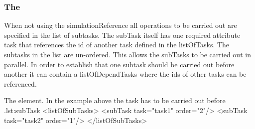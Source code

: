 \subsubsection{ The }
\label{class:subTasks}
When not using the simulationReference all operations to be carried out are specified in the list of subtasks. The subTask itself has one required attribute task that references the id of another task defined in the listOfTasks. The subtasks in the list are un-ordered.  This allows the subTasks to be carried out in parallel. In order to establish that one subtask should be carried out before another it can contain a listOfDependTasks where the ids of other tasks can be referenced. 
\begin{myXmlLst}{The  element. In the example above the task  has to be carried out before .}{lst:subTask}
  <listOfSubTasks>
    <subTask task="task1" order="2"/> 
    <subTask task="task2" order="1"/> 
  </listOfSubTasks>
\end{myXmlLst}

 


